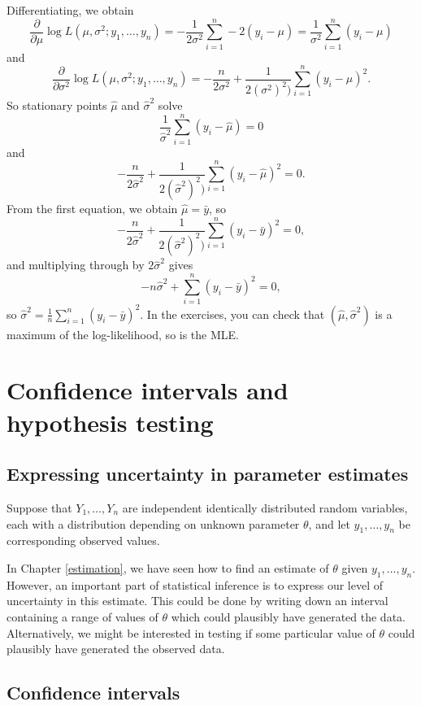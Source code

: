 \documentclass[]{book}
\theoremstyle{definition}
\theoremstyle{definition}
\theoremstyle{definition}
\theoremstyle{remark}
\begin{document}
Differentiating, we obtain
\[\frac{\partial}{\partial \mu} \log L(\mu, \sigma^2; y_1, \ldots, y_n)
= -\frac{1}{2 \sigma^2} \sum_{i=1}^n - 2(y_i - \mu) = 
\frac{1}{\sigma^2} \sum_{i=1}^n (y_i - \mu)\] and
\[\frac{\partial}{\partial \sigma^2} \log L(\mu, \sigma^2; y_1, \ldots, y_n) 
= -\frac{n}{2 \sigma^2} + \frac{1}{2(\sigma^2)^2)} \sum_{i=1}^n (y_i - \mu)^2.\]
 So stationary points \(\hat \mu\) and
\(\hat \sigma^2\) solve
\[\frac{1}{\hat \sigma^2} \sum_{i=1}^n (y_i - \hat \mu) = 0\] and
\[ -\frac{n}{2 \hat \sigma^2} + \frac{1}{2(\hat \sigma^2)^2)} \sum_{i=1}^n (y_i - \hat \mu)^2 = 0.\]
From the first equation, we obtain \(\hat \mu = \bar y\), so
\[ -\frac{n}{2 \hat \sigma^2} + \frac{1}{2(\hat \sigma^2)^2)} \sum_{i=1}^n (y_i - \bar y)^2 = 0,\]
and multiplying through by \(2 \hat \sigma^2\) gives
\[ -n \hat \sigma^2 +  \sum_{i=1}^n (y_i - \bar y)^2 = 0,\] so
\(\hat \sigma^2 = \frac{1}{n} \sum_{i=1}^n (y_i - \bar y)^2\). In the
exercises, you can check that \((\hat \mu, \hat \sigma^2)\) is a maximum
of the log-likelihood, so is the MLE.

\chapter{Confidence intervals and hypothesis testing}\label{inference}

\section{Expressing uncertainty in parameter
estimates}\label{expressing-uncertainty-in-parameter-estimates}

Suppose that \(Y_1, \ldots, Y_n\) are independent identically
distributed random variables, each with a distribution depending on
unknown parameter \(\theta\), and let \(y_1, \ldots, y_n\) be
corresponding observed values.

In Chapter \ref{estimation}, we have seen how to find an estimate of
\(\theta\) given \(y_1, \ldots, y_n\). However, an important part of
statistical inference is to express our level of uncertainty in this
estimate. This could be done by writing down an interval containing a
range of values of \(\theta\) which could plausibly have generated the
data. Alternatively, we might be interested in testing if some
particular value of \(\theta\) could plausibly have generated the
observed data.

\section{Confidence intervals}\label{confidence-intervals}
\end{document}
